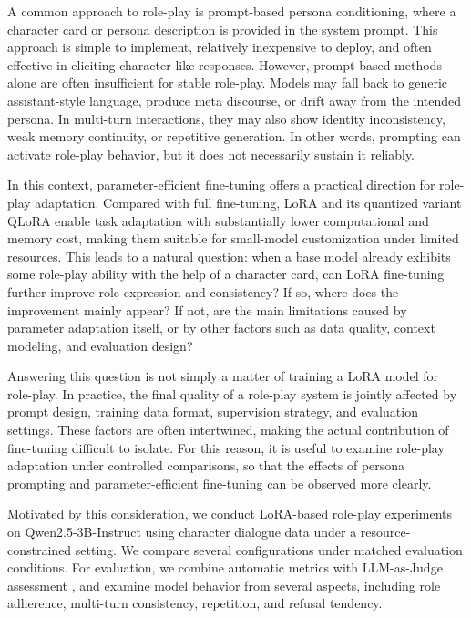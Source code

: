 \documentclass{article}
\begin{document}
A common approach to role-play is prompt-based persona conditioning, where a
character card or persona description is provided in the system prompt. This
approach is simple to implement, relatively inexpensive to deploy, and often
effective in eliciting character-like responses. However, prompt-based methods
alone are often insufficient for stable role-play. Models may fall back to
generic assistant-style language, produce meta discourse, or drift away from
the intended persona. In multi-turn interactions, they may also show identity
inconsistency, weak memory continuity, or repetitive generation. In other
words, prompting can activate role-play behavior, but it does not necessarily
sustain it reliably.

In this context, parameter-efficient fine-tuning offers a practical direction
for role-play adaptation. Compared with full fine-tuning, LoRA and its
quantized variant QLoRA enable task adaptation with substantially lower
computational and memory cost, making them suitable for small-model
customization under limited resources. This leads to a natural question: when a
base model already exhibits some role-play ability with the help of a character
card, can LoRA fine-tuning further improve role expression and consistency? If
so, where does the improvement mainly appear? If not, are the main limitations
caused by parameter adaptation itself, or by other factors such as data
quality, context modeling, and evaluation design?

Answering this question is not simply a matter of training a LoRA model for
role-play. In practice, the final quality of a role-play system is jointly
affected by prompt design, training data format, supervision strategy, and
evaluation settings. These factors are often intertwined, making the actual
contribution of fine-tuning difficult to isolate. For this reason, it is useful
to examine role-play adaptation under controlled comparisons, so that the
effects of persona prompting and parameter-efficient fine-tuning can be
observed more clearly.

Motivated by this consideration, we conduct LoRA-based role-play experiments on
Qwen2.5-3B-Instruct using character dialogue data under a resource-constrained
setting. We compare several configurations under matched evaluation conditions.
For evaluation, we combine automatic metrics with LLM-as-Judge assessment
\citep{zheng2023judging}, and examine model behavior from several aspects,
including role adherence,
multi-turn consistency, repetition, and refusal tendency.
\end{document}
